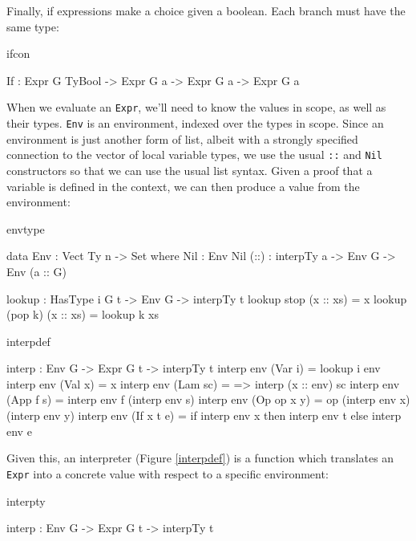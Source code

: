 \noindent
Finally, if expressions make a choice given a boolean. Each branch must
have the same type:

\begin{SaveVerbatim}{ifcon}

If  : Expr G TyBool -> Expr G a -> Expr G a -> Expr G a

\end{SaveVerbatim}

\noindent
When we evaluate an \texttt{Expr}, we'll need to know the values in scope, as well as
their types. \texttt{Env} is an environment, indexed over the types in scope.
Since an environment is just another form of list, albeit with a strongly specified connection
to the vector of local variable types, we use the usual \texttt{::} and \texttt{Nil}
constructors so that we can use the usual list syntax. Given a proof that a variable
is defined in the context, we can then produce a value from the environment:

\begin{SaveVerbatim}{envtype}

data Env : Vect Ty n -> Set where
    Nil  : Env Nil
    (::) : interpTy a -> Env G -> Env (a :: G)

lookup : HasType i G t -> Env G -> interpTy t
lookup stop    (x :: xs) = x
lookup (pop k) (x :: xs) = lookup k xs

\end{SaveVerbatim}

\begin{SaveVerbatim}{interpdef}

interp : Env G -> Expr G t -> interpTy t
interp env (Var i)     = lookup i env
interp env (Val x)     = x
interp env (Lam sc)    = \x => interp (x :: env) sc
interp env (App f s)   = interp env f (interp env s)
interp env (Op op x y) = op (interp env x) (interp env y)
interp env (If x t e)  = if interp env x then interp env t 
                                         else interp env e

\end{SaveVerbatim}

\noindent
Given this, an interpreter (Figure \ref{interpdef})
is a function which translates an \texttt{Expr} into a
concrete \Idris{} value with respect to a specific environment:

\begin{SaveVerbatim}{interpty}

interp : Env G -> Expr G t -> interpTy t

\end{SaveVerbatim}


